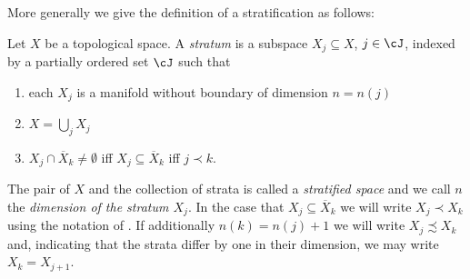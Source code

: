 More generally we give the definition of a stratification as follows:
\begin{definition}\label{df:stratified_space}
  Let $X$ be a topological space. A \emph{stratum} is a subspace $X_j\subseteq X$, $j\in\cJ$, indexed by a partially ordered set $\cJ$ such that
  \begin{enumerate}
    \item each $X_j$ is a manifold without boundary of dimension $n=n(j)$
    \item $X=\bigcup_jX_j$
    \item $X_j\cap \overline{X}_k\neq\emptyset$ iff $X_j\subseteq\overline{X}_k$ iff $j\prec k$.
  \end{enumerate}
  The pair of $X$ and the collection of strata is called a \emph{stratified space} and we call
  $n$ the \emph{dimension of the stratum $X_j$}.
  In the case that $X_j\subseteq\overline{X}_k$ 
  we will write $X_j\prec X_k$ using the notation of \cite{Handron2002}.
  If additionally $n(k)=n(j)+1$ we will
  write $X_j\precsim X_k$ and, indicating that the strata differ by one in their dimension, we may write $X_k=X_{j+1}$.
\end{definition}

